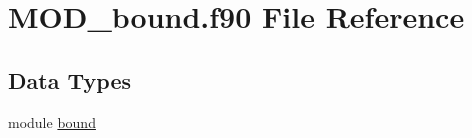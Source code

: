 \hypertarget{MOD__bound_8f90}{\section{M\-O\-D\-\_\-bound.\-f90 File Reference}
\label{MOD__bound_8f90}
}
\subsection*{Data Types}
\begin{DoxyCompactItemize}
\item 
module \hyperlink{classbound}{bound}
\end{DoxyCompactItemize}
